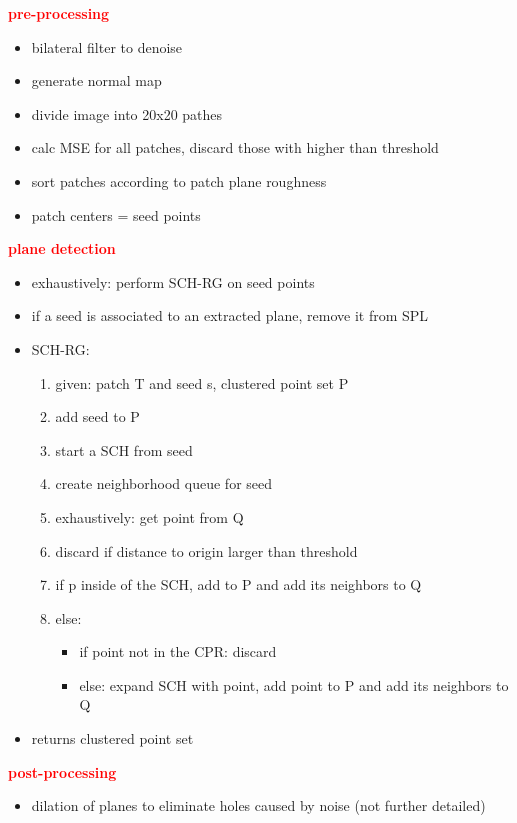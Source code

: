 \documentclass[main.tex]{subfiles}
\begin{document}
\textbf{\textcolor{red}{pre-processing}}
\begin{itemize}
    \item bilateral filter to denoise
    \item generate normal map
    \item divide image into 20x20 pathes
    \item calc MSE for all patches, discard those with higher than threshold
    \item sort patches according to patch plane roughness
    \item patch centers = seed points
\end{itemize}
\textbf{\textcolor{red}{plane detection}}
\begin{itemize}
    \item exhaustively: perform SCH-RG on seed points
    \item if a seed is associated to an extracted plane, remove it from SPL
    \item SCH-RG:
          \begin{enumerate}
              \item given: patch T and seed s, clustered point set P
              \item add seed to P
              \item start a SCH from seed
              \item create neighborhood queue for seed
              \item exhaustively: get point from Q
              \item discard if distance to origin larger than threshold
              \item if p inside of the SCH, add to P and add its neighbors to Q
              \item else:
                    \begin{itemize}
                        \item if point not in the CPR: discard
                        \item else: expand SCH with point, add point to P and add its neighbors to Q
                    \end{itemize}
          \end{enumerate}
    \item returns clustered point set
\end{itemize}

\textbf{\textcolor{red}{post-processing}}
\begin{itemize}
    \item dilation of planes to eliminate holes caused by noise (not further detailed)
\end{itemize}
\end{document}
